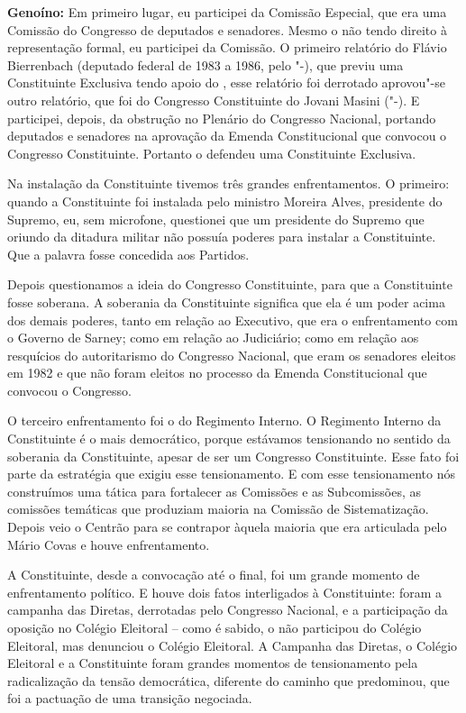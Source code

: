 \textbf{Genoíno:} Em primeiro lugar, eu participei da Comissão Especial,
que era uma Comissão do Congresso de deputados e senadores. Mesmo o 
não tendo direito à representação formal, eu participei da Comissão. O
primeiro relatório do Flávio Bierrenbach (deputado federal de 1983 a
1986, pelo "-), que previu uma Constituinte Exclusiva tendo apoio
do , esse relatório foi derrotado aprovou"-se outro relatório, que foi
do Congresso Constituinte do Jovani Masini ("-). E participei,
depois, da obstrução no Plenário do Congresso Nacional, portando
deputados e senadores na aprovação da Emenda Constitucional que convocou
o Congresso Constituinte. Portanto o  defendeu uma Constituinte
Exclusiva.

Na instalação da Constituinte tivemos três grandes enfrentamentos. O
primeiro: quando a Constituinte foi instalada pelo ministro Moreira
Alves, presidente do Supremo, eu, sem microfone, questionei que um
presidente do Supremo que oriundo da ditadura militar não possuía
poderes para instalar a Constituinte. Que a palavra fosse concedida aos
Partidos.

Depois questionamos a ideia do Congresso Constituinte, para que a
Constituinte fosse soberana. A soberania da Constituinte significa que
ela é um poder acima dos demais poderes, tanto em relação ao Executivo,
que era o enfrentamento com o Governo de Sarney; como em relação ao
Judiciário; como em relação aos resquícios do autoritarismo do Congresso
Nacional, que eram os senadores eleitos em 1982 e que não foram eleitos
no processo da Emenda Constitucional que convocou o Congresso.

O terceiro enfrentamento foi o do Regimento Interno. O Regimento Interno
da Constituinte é o mais democrático, porque estávamos tensionando no
sentido da soberania da Constituinte, apesar de ser um Congresso
Constituinte. Esse fato foi parte da estratégia que exigiu esse
tensionamento. E com esse tensionamento nós construímos uma tática para
fortalecer as Comissões e as Subcomissões, as comissões temáticas que
produziam maioria na Comissão de Sistematização. Depois veio o Centrão
para se contrapor àquela maioria que era articulada pelo Mário Covas e
houve enfrentamento.

A Constituinte, desde a convocação até o final, foi um grande momento de
enfrentamento político. E houve dois fatos interligados à Constituinte:
foram a campanha das Diretas, derrotadas pelo Congresso Nacional, e a
participação da oposição no Colégio Eleitoral -- como é sabido, o  não
participou do Colégio Eleitoral, mas denunciou o Colégio Eleitoral. A
Campanha das Diretas, o Colégio Eleitoral e a Constituinte foram grandes
momentos de tensionamento pela radicalização da tensão democrática,
diferente do caminho que predominou, que foi a pactuação de uma
transição negociada.

